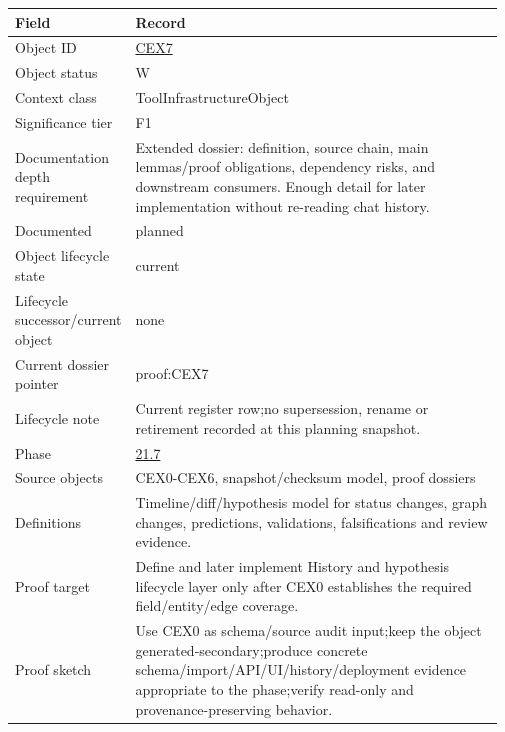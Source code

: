 \begin{longtable}{L{0.16\linewidth} L{0.81\linewidth}}
\hline
\textbf{Field} & \textbf{Record}\\
\hline
Object ID & \hyperlink{object-row-CEX7}{CEX7}\\
\hline\addlinespace[0.20em]
Object status & W\\
\hline\addlinespace[0.20em]
Context class & ToolInfrastructureObject\\
\hline\addlinespace[0.20em]
Significance tier & F1\\
\hline\addlinespace[0.20em]
Documentation depth requirement & Extended dossier: definition, source chain, main lemmas/\allowbreak{}proof obligations, dependency risks, and downstream consumers. Enough detail for later implementation without re-reading chat history.\\
\hline\addlinespace[0.20em]
Documented & planned\\
\hline\addlinespace[0.20em]
Object lifecycle state & current\\
\hline\addlinespace[0.20em]
Lifecycle successor/\allowbreak{}current object & none\\
\hline\addlinespace[0.20em]
Current dossier pointer & proof:CEX7\\
\hline\addlinespace[0.20em]
Lifecycle note & Current register row;\newline no supersession, rename or retirement recorded at this planning snapshot.\\
\hline\addlinespace[0.20em]
Phase & \hyperlink{phase-row-21-7}{21.7}\\
\hline\addlinespace[0.20em]
Source objects & CEX0-CEX6, snapshot/\allowbreak{}checksum model, proof dossiers\\
\hline\addlinespace[0.20em]
Definitions & Timeline/\allowbreak{}diff/\allowbreak{}hypothesis model for status changes, graph changes, predictions, validations, falsifications and review evidence.\\
\hline\addlinespace[0.20em]
Proof target & Define and later implement History and hypothesis lifecycle layer only after CEX0 establishes the required field/\allowbreak{}entity/\allowbreak{}edge coverage.\\
\hline\addlinespace[0.20em]
Proof sketch & Use CEX0 as schema/\allowbreak{}source audit input;\newline keep the object generated-secondary;\newline produce concrete schema/\allowbreak{}import/\allowbreak{}API/\allowbreak{}UI/\allowbreak{}history/\allowbreak{}deployment evidence appropriate to the phase;\newline verify read-only and provenance-preserving behavior.\\

\end{longtable}
